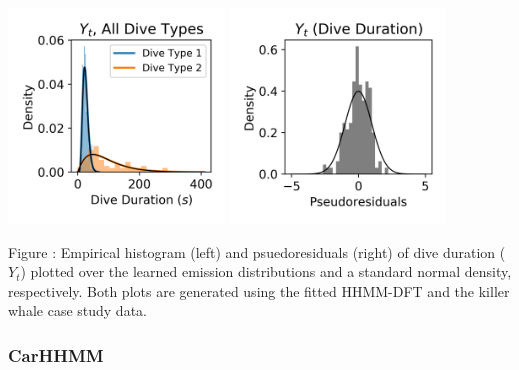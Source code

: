 \documentclass{article}
\begin{document}
        \begin{center}
        \includegraphics[width=2.25in]{../Plots/HHMM_empirical_hist_dive_duration.png}
        \includegraphics[width=2.25in]{../Plots/HHMM_psedoresids_Dive_Duration.png}
        \end{center}
        
        \noindent Figure : Empirical histogram (left) and psuedoresiduals (right) of dive duration ($Y_{t}$) plotted over the learned emission distributions and a standard normal density, respectively. Both plots are generated using the fitted HHMM-DFT and the killer whale case study data.
        \addtocounter{fignum}{1}
        
        \subsubsection{CarHHMM}
        
\end{document}
